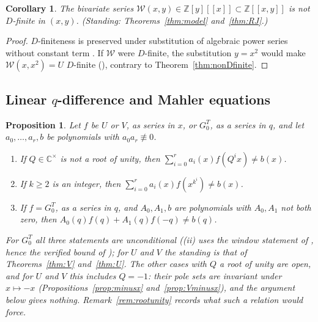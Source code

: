\documentclass[11pt]{article}
\theoremstyle{plain}
\newtheorem{corollary}[theorem]{Corollary}
\newtheorem{proposition}[theorem]{Proposition}
\theoremstyle{definition}
\theoremstyle{remark}
\newcommand{\Z}{\mathbb{Z}}
\newcommand{\C}{\mathbb{C}}
\theoremstyle{plain}\newtheorem*{maintheorem}{Main Theorem}
\begin{document}
\begin{corollary}\label{cor:Wnotdfinite}
The bivariate series $\mathcal W(x,y)\in\Z[y][[x]]\subset\Z[[x,y]]$ is not $D$-finite in $(x,y)$.
\textup{(}Standing: Theorems~\ref{thm:model} and~\ref{thm:RJ}.\textup{)}
\end{corollary}

\begin{proof}
$D$-finiteness is preserved under substitution of algebraic power series without constant term
\cite{Lipshitz1989}. If $\mathcal W$ were $D$-finite, the substitution $y=x^2$ would make
$\mathcal W(x,x^2)=U$ $D$-finite ({\cite[Corollary \textup{cor:M3prime-growth}]{Bonfioli2026bB}}), contrary to
Theorem~\ref{thm:nonDfinite}.
\end{proof}

\subsection{Linear \texorpdfstring{$q$}{q}-difference and Mahler equations}

\begin{proposition}\label{prop:noqdiff}
Let $f$ be $U$ or $V$, as series in $x$, or $G^T_0$, as a series in $q$, and let $a_0,\dots,a_r,b$
be polynomials with $a_0a_r\not\equiv0$.
\begin{enumerate}[label=\textup{(\roman*)},leftmargin=2.2em,itemsep=0.1em,topsep=0.2em]
\item If $Q\in\C^\times$ is not a root of unity, then $\sum_{i=0}^ra_i(x)f(Q^ix)\ne b(x)$.
\item If $k\ge2$ is an integer, then $\sum_{i=0}^ra_i(x)f(x^{k^i})\ne b(x)$.
\item If $f=G^T_0$, as a series in $q$, and $A_0,A_1,b$ are polynomials with $A_0,A_1$ not both
zero, then $A_0(q)f(q)+A_1(q)f(-q)\ne b(q)$.
\end{enumerate}
For $G^T_0$ all three statements are unconditional \textup{(}\textup{(ii)} uses the window statement of
\cite[Lemma \textup{lem:infpoles}]{Bonfioli2026bB}, hence the verified bound of
\cite[Lemma \textup{lem:T2abs}]{Bonfioli2026bB}\textup{)}; for $U$ and $V$ the standing is that of
Theorems~\ref{thm:V} and~\ref{thm:U}. The other cases with $Q$ a root of unity are open, and for
$U$ and $V$ this includes $Q=-1$: their pole sets are invariant under $x\mapsto-x$
\textup{(}Propositions~\ref{prop:minusx} and~\ref{prop:Vminusx}\textup{)}, and the argument below
gives nothing. Remark~\ref{rem:rootunity} records what such a relation would force.
\end{proposition}
\end{document}
